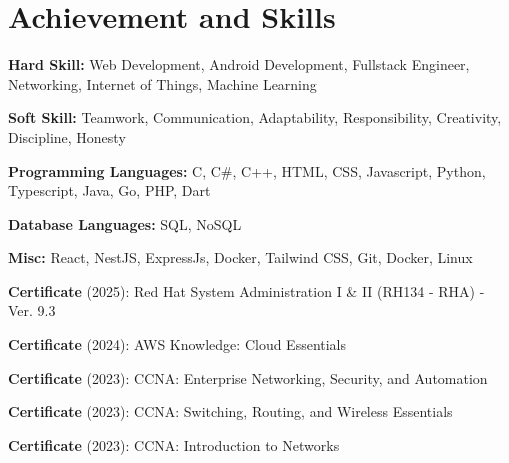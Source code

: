 \documentclass[../main.tex]{subfiles}
\begin{document}
\section{Achievement and Skills}
\begin{highlights}
    \item \textbf{Hard Skill:} Web Development, Android Development, Fullstack Engineer, Networking, Internet of Things, Machine Learning
    \item \textbf{Soft Skill:} Teamwork, Communication, Adaptability, Responsibility, Creativity, Discipline, Honesty
    \item \textbf{Programming Languages:} C, C\#, C++, HTML, CSS, Javascript, Python, Typescript, Java, Go, PHP, Dart
    \item \textbf{Database Languages:} SQL, NoSQL
    \item \textbf{Misc:} React, NestJS, ExpressJs, Docker, Tailwind CSS, Git, Docker, Linux
    \item \textbf{Certificate} (2025): Red Hat System Administration I \& II (RH134 - RHA) - Ver. 9.3
    \item \textbf{Certificate} (2024): AWS Knowledge: Cloud Essentials
    \item \textbf{Certificate} (2023): CCNA: Enterprise Networking, Security, and Automation
    \item \textbf{Certificate} (2023): CCNA: Switching, Routing, and Wireless Essentials
    \item \textbf{Certificate} (2023): CCNA: Introduction to Networks
\end{highlights}
\end{document}
